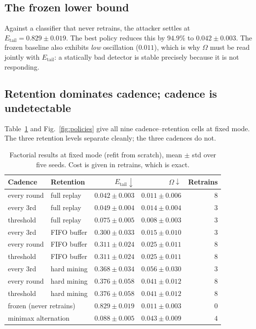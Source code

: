 \documentclass[conference]{IEEEtran}
\newcommand{\evrate}{\ensuremath{E_{\mathrm{tail}}}}
\newcommand{\osc}{\ensuremath{\Omega}}
\begin{document}
\subsection{The frozen lower bound}

Against a classifier that never retrains, the attacker settles at
$\evrate=0.829\pm0.019$. The best policy reduces this by $94.9\%$ to
$0.042\pm0.003$. The frozen baseline also exhibits \emph{low} oscillation
($0.011$), which is why $\osc$ must be read jointly with $\evrate$: a
statically bad detector is stable precisely because it is not responding.

\subsection{Retention dominates cadence; cadence is undetectable}

Table~\ref{tab:policies} and Fig.~\ref{fig:policies} give all nine
cadence--retention cells at fixed mode. The three retention levels separate
cleanly; the three cadences do not.

\begin{table}[t]
\caption{Factorial results at fixed mode (refit from scratch), mean $\pm$ std
over five seeds. Cost is given in retrains, which is exact.}
\label{tab:policies}
\centering
\small
\begin{tabular}{llrrr}
\toprule
Cadence & Retention & $\evrate\downarrow$ & $\osc\downarrow$ & Retrains \\
\midrule
every round & full replay & $0.042\pm0.003$ & $0.011\pm0.006$ & $8$ \\
every 3rd   & full replay & $0.049\pm0.004$ & $0.014\pm0.004$ & $3$ \\
threshold   & full replay & $0.075\pm0.005$ & $0.008\pm0.003$ & $3$ \\
every 3rd   & FIFO buffer & $0.300\pm0.033$ & $0.015\pm0.010$ & $3$ \\
every round & FIFO buffer & $0.311\pm0.024$ & $0.025\pm0.011$ & $8$ \\
threshold   & FIFO buffer & $0.311\pm0.024$ & $0.025\pm0.011$ & $8$ \\
every 3rd   & hard mining & $0.368\pm0.034$ & $0.056\pm0.030$ & $3$ \\
every round & hard mining & $0.376\pm0.058$ & $0.041\pm0.012$ & $8$ \\
threshold   & hard mining & $0.376\pm0.058$ & $0.041\pm0.012$ & $8$ \\
\midrule
\multicolumn{2}{l}{frozen (never retrains)} & $0.829\pm0.019$ & $0.011\pm0.003$ & $0$ \\
\multicolumn{2}{l}{minimax alternation} & $0.088\pm0.005$ & $0.043\pm0.009$ & $4$ \\
\bottomrule
\end{tabular}
\end{table}
\end{document}
